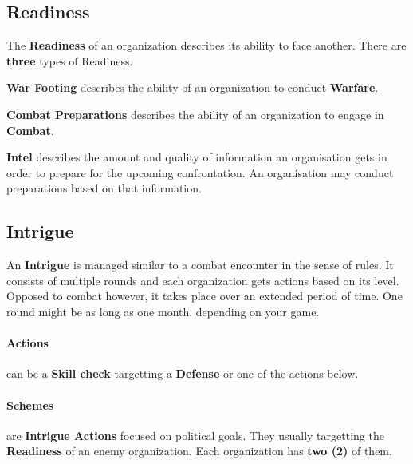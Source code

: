 \documentclass[letterpaper,twocolumn,openany,nodeprecatedcode]{dndbook}
\begin{document}
\subsection{Readiness}
The \textbf{Readiness} of an organization describes its ability to face another.
There are \textbf{three} types of Readiness.

\textbf{War Footing} describes the ability of an organization to conduct \textbf{Warfare}.

\textbf{Combat Preparations} describes the ability of an organization to engage in \textbf{Combat}.

\textbf{Intel} describes the amount and quality of information an organisation gets in order to prepare for the upcoming confrontation.
An organisation may conduct preparations based on that information.


\subsection{Intrigue}
An \textbf{Intrigue} is managed similar to a combat encounter in the sense of rules.
It consists of multiple rounds and each organization gets actions based on its level.
Opposed to combat however, it takes place over an extended period of time.
One round might be as long as one month, depending on your game.

\paragraph{Actions} can be a \textbf{Skill check} targetting a \textbf{Defense} or one of the actions below.

\paragraph{Schemes} are \textbf{Intrigue Actions} focused on political goals.
They usually targetting the \textbf{Readiness} of an enemy organization.
Each organization has \textbf{two (2)} of them.
\end{document}
